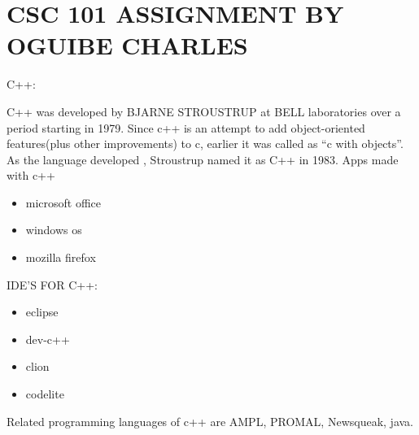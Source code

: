 \documentclass{article}
\begin{document}
	\section{CSC 101 ASSIGNMENT BY OGUIBE CHARLES}
	          {C++:}
	          
	  C++ was developed by BJARNE STROUSTRUP at BELL laboratories over a period starting in 1979. Since c++ is an attempt to add object-oriented features(plus other improvements) to c, earlier it was called as “c with objects”. As the language developed , Stroustrup named it as C++ in 1983.
	  Apps made with c++
	  \begin{itemize}
	  	\item{microsoft office}
	  	\item{windows os}
	  	\item{mozilla firefox}
	  \end{itemize}
  
  
  {IDE'S FOR C++:}
  \begin{itemize}
  	\item {eclipse}
  	\item{ dev-c++}
  	\item{clion}
  	\item{codelite}
  	  \end{itemize}
    
    Related programming languages of c++ are AMPL, PROMAL, Newsqueak, java.
    
\end{document}
